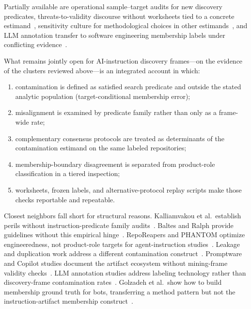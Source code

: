 Partially available are operational sample--target audits for new discovery predicates, threats-to-validity discourse without worksheets tied to a concrete estimand~\cite{ampatzoglou2019threats,verdecchia2023threats,siegmund2015views}, sensitivity culture for methodological choices in other estimands~\cite{tantithamthavorn2017validation}, and LLM annotation transfer to software engineering membership labels under conflicting evidence~\cite{gilardi2023chatgpt,ahmed2025llms}.

What remains jointly open for AI-instruction discovery frames---on the evidence of the clusters reviewed above---is an integrated account in which:
\begin{enumerate}
  \item contamination is defined as satisfied search predicate and outside the stated analytic population (target-conditional membership error);
  \item misalignment is examined by predicate family rather than only as a frame-wide rate;
  \item complementary consensus protocols are treated as determinants of the contamination estimand on the same labeled repositories;
  \item membership-boundary disagreement is separated from product-role classification in a tiered inspection;
  \item worksheets, frozen labels, and alternative-protocol replay scripts make those checks reportable and repeatable.
\end{enumerate}
Closest neighbors fall short for structural reasons.
Kalliamvakou et al.\ establish perils without instruction-predicate family audits~\cite{kalliamvakou2015indepth}.
Baltes and Ralph provide guidelines without this empirical hinge~\cite{baltes2022sampling}.
RepoReapers and PHANTOM optimize engineeredness, not product-role targets for agent-instruction studies~\cite{munaiah2017curating,phantom2020}.
Leakage and duplication work address a different contamination construct~\cite{kaufman2012,lopes2017dejavu,allamanis2019duplication}.
Promptware and Copilot studies document the artifact ecosystem without mining-frame validity checks~\cite{chen2025promptware,ziegler2024copilot,vaithilingam2022expectation}.
LLM annotation studies address labeling technology rather than discovery-frame contamination rates~\cite{ahmed2025llms,gilardi2023chatgpt}.
Golzadeh et al.\ show how to build membership ground truth for bots, transferring a method pattern but not the instruction-artifact membership construct~\cite{golzadeh2021bots}.

